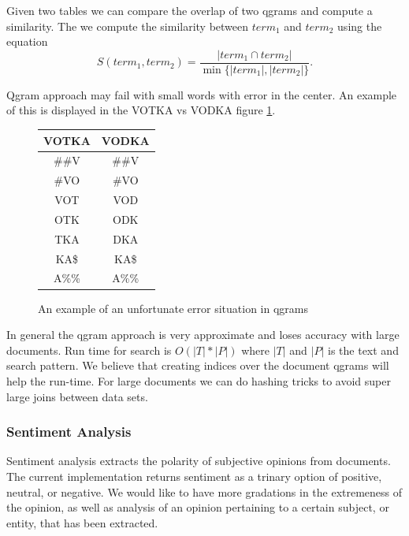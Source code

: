 \documentclass[11pt,onecolumn]{article}
\begin{document}
Given two tables we can compare the overlap of two qgrams and compute a
similarity. The we compute the similarity between $term_1$ and $term_2$
using the equation
$$ S(term_1,term_2) = 
\frac{|term_1 \cap term_2|}{\min\{|term_1|, |term_2|\}} .$$

Qgram approach may fail with small words with error in the center. An 
example of this is displayed in the VOTKA vs VODKA figure \ref{tab:vodka}.

	\begin{figure}
\begin{center}
    \begin{tabular}{|c|c|}
		\hline
      \textbf{VOTKA} & \textbf{VODKA} \\ \hline
      {\color{blue}\#\#V} & {\color{blue}\#\#V} \\
		\hline
      {\color{blue}\#VO} & {\color{blue}\#VO} \\
		\hline
      {\color{red}VOT} &  {\color{red}VOD} \\
		\hline
      {\color{red} OTK} &{\color{red} ODK} \\
		\hline
      {\color{red} TKA} &{\color{red} DKA} \\
		\hline
      {\color{blue}KA\$} & {\color{blue}KA\$} \\
		\hline
      {\color{blue}A\%\%} &  {\color{blue}A\%\%} \\
		\hline
    \end{tabular}
\end{center}
\caption{An example of an unfortunate error situation in qgrams} 
\label{tab:vodka}
	\end{figure}

In general the qgram approach is very approximate and loses accuracy with
large documents.
Run time for search is $O(|T|*|P|)$ where $|T|$ and $|P|$ is the text and
search pattern. We believe that creating indices over the document qgrams
will help the run-time. 
For large documents we can do hashing tricks to avoid super large 
joins between data sets.  


    \subsubsection{Sentiment Analysis}
    \label{sec:SCSA}

    Sentiment analysis extracts the polarity of subjective opinions from documents.
    The current implementation returns sentiment as a trinary option of positive, neutral, or negative.
    We would like to have more gradations in the extremeness of the opinion,
    as well as analysis of an opinion pertaining to a certain subject, or entity, that has been extracted.
\end{document}
